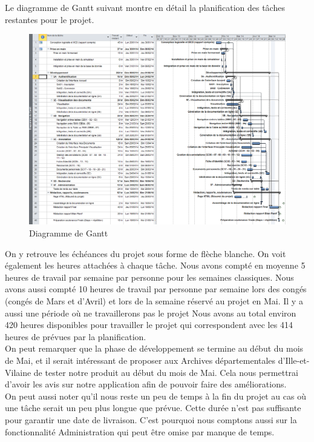 \documentclass[a4paper]{article}
\begin{document}
	Le diagramme de Gantt suivant montre en détail la planification des tâches restantes pour le projet.

\begin{figure}[H]
\centering
\includegraphics[width=\textwidth]{gantt.png}
\caption{Diagramme de Gantt}
\label{fig:gantt}
\end{figure}

	On y retrouve les échéances du projet sous forme de flèche blanche. On voit également les heures attachées à chaque tâche. Nous avons compté en moyenne 5 heures de travail par semaine par personne pour les semaines classiques. 
Nous avons aussi compté 10 heures de travail par personne par semaine lors des congés (congés de Mars et d'Avril) et lors de la semaine réservé au projet en Mai. Il y a aussi une période où ne travaillerons pas le projet  Nous avons au total environ 420 heures disponibles pour travailler le projet qui correspondent avec les 414 heures de prévues par la planification.\\

	On peut remarquer que la phase de développement se termine au début du mois de Mai, et il serait intéressant de proposer aux Archives départementales d’Ille-et-Vilaine de tester notre produit au début du mois de Mai. Cela nous permettrai d'avoir les avis sur notre application afin de pouvoir faire des améliorations.\\

	On peut aussi noter qu'il nous reste un peu de temps à la fin du projet au cas où une tâche serait un peu plus longue que prévue. Cette durée n'est pas suffisante pour garantir une date de livraison. C'est pourquoi nous comptons aussi sur la fonctionnalité Administration qui peut être omise par manque de temps.\\
	
\end{document}
